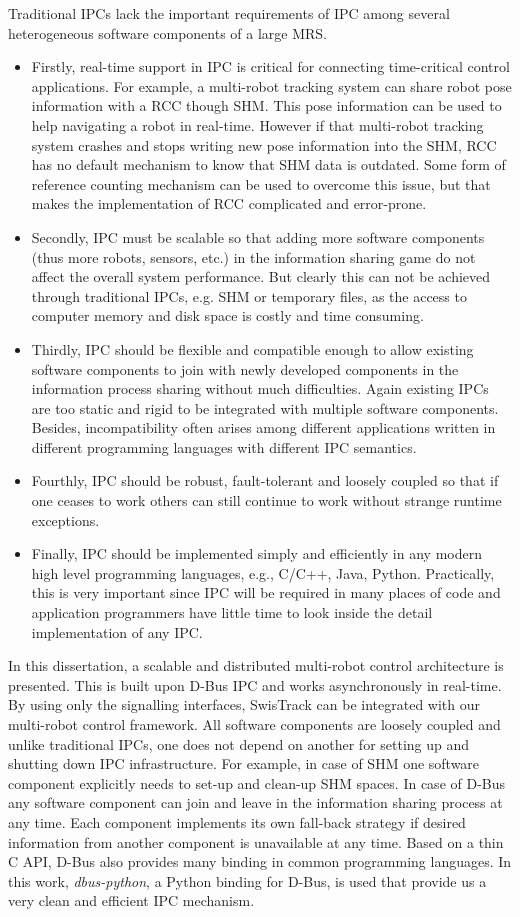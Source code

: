 Traditional IPCs lack the important requirements of IPC among several heterogeneous software components of a large MRS. 
\begin{itemize}
\item Firstly, real-time support in IPC is critical for connecting time-critical control applications. For example, a multi-robot tracking system  can share robot pose information with a \acf{RCC} though  \acf{SHM}. This pose information can be used to help navigating a robot in real-time. However if that multi-robot tracking system crashes and stops writing new pose information into the SHM, RCC has no default mechanism to know that SHM data is outdated. Some form of reference counting mechanism can be used to overcome this issue, but that makes the implementation of RCC complicated and error-prone.
%
\item Secondly, IPC must be scalable so that adding more software components (thus more robots, sensors, etc.) in the information sharing game do not affect the overall system performance. But clearly this can not be achieved through traditional IPCs, e.g. SHM or temporary files, as the access to computer memory and disk space is costly and time consuming.
%
\item Thirdly, IPC should be flexible and compatible enough to allow existing software components to join with newly developed components in the information process sharing without much difficulties. Again existing IPCs are too static and rigid to be integrated with multiple software components. Besides, incompatibility often arises among different applications written in different programming languages with different IPC semantics.
%
\item Fourthly, IPC should be robust, fault-tolerant and loosely coupled so that if one ceases to work others can still continue to work without strange runtime exceptions. 
%
\item Finally, IPC should be implemented simply and efficiently in any modern high level programming languages, e.g., C/C++, Java, Python. Practically, this is very important since IPC will be required in many places of code and application programmers have little time to look inside the detail implementation of any IPC.
\end{itemize}
%
In this dissertation, a scalable and distributed multi-robot control architecture is presented. This is built upon D-Bus IPC and works asynchronously in real-time. By using only the signalling interfaces, SwisTrack can be integrated with our multi-robot control framework. All software components are loosely coupled and unlike traditional IPCs, one does not depend on another for setting up and shutting down IPC infrastructure. For example, in case of SHM one software component explicitly needs to set-up and clean-up SHM spaces. In case of D-Bus any software component can join and leave in the information sharing process at any time. Each component implements its own fall-back strategy if desired information from another component is unavailable at any time. Based on a thin C API, D-Bus also provides many binding in common programming languages. In this work,  {\em dbus-python}, a Python binding for D-Bus,  is used that provide us a very clean and efficient IPC mechanism.
